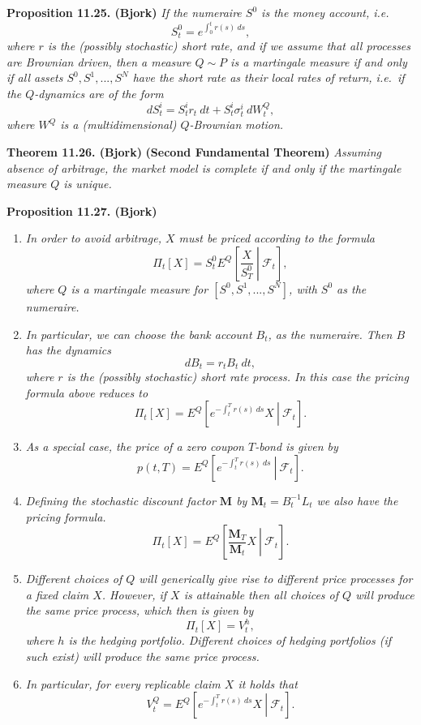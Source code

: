 \documentclass[
]{book}
\providecommand{\tightlist}{%
  \setlength{\itemsep}{0pt}\setlength{\parskip}{0pt}}
\begin{document}
\textbf{Proposition 11.25. (Bjork)} \emph{If the numeraire \(S^0\) is the money account, i.e.}
\[
S^0_t=e^{\int_0^t r(s)\ ds},
\]
\emph{where \(r\) is the (possibly stochastic) short rate, and if we assume that all processes are Brownian driven, then a measure \(Q\sim P\) is a martingale measure if and only if all assets \(S^0,S^1,...,S^N\) have the short rate as their local rates of return, i.e.~if the \(Q\)-dynamics are of the form}
\[
dS_t^i=S_t^ir_t\ dt+S_t^i \sigma_t^i\ dW_t^Q,\tag{11.54}
\]
\emph{where \(W^Q\) is a (multidimensional) \(Q\)-Brownian motion.}

\textbf{Theorem 11.26. (Bjork)} \textbf{(Second Fundamental Theorem)} \emph{Assuming absence of arbitrage, the market model is complete if and only if the martingale measure \(Q\) is unique.}

\textbf{Proposition 11.27. (Bjork)}

\begin{enumerate}
\def\labelenumi{\arabic{enumi}.}
\tightlist
\item
  \emph{In order to avoid arbitrage, \(X\) must be priced according to the formula}
  \[
    \Pi_t[X]=S^0_tE^Q\left[\left. \frac{X}{S^0_T}\ \right\vert\ \mathcal{F}_t\right],\tag{11.55}
    \]
  \emph{where \(Q\) is a martingale measure for \([S^0,S^1,...,S^N]\), with \(S^0\) as the numeraire.}
\item
  \emph{In particular, we can choose the bank account \(B_t\), as the numeraire. Then \(B\) has the dynamics}
  \[
    dB_t=r_tB_t\ dt,\tag{11.56}
    \]
  \emph{where \(r\) is the (possibly stochastic) short rate process. In this case the pricing formula above reduces to}
  \[
    \Pi_t[X]=E^Q\left[\left. e^{-\int_t^T r(s)\ ds}X\ \right\vert\ \mathcal{F}_t\right].\tag{11.57}
    \]
\item
  \emph{As a special case, the price of a zero coupon \(T\)-bond is given by}
  \[
    p(t,T)=E^Q\left[\left. e^{-\int_t^T r(s)\ ds}\ \right\vert\ \mathcal{F}_t\right].\tag{11.58}
    \]
\item
  \emph{Defining the stochastic discount factor \(\mathbf{M}\) by \(\mathbf{M}_t=B_t^{-1}L_t\) we also have the pricing formula.}
  \[
    \Pi_t[X]=E^Q\left[\left. \frac{\mathbf{M}_T}{\mathbf{M}_t}X\ \right\vert\ \mathcal{F}_t\right].\tag{11.59}
    \]
\item
  \emph{Different choices of \(Q\) will generically give rise to different price processes for a fixed claim \(X\). However, if \(X\) is attainable then all choices of \(Q\) will produce the same price process, which then is given by}
  \[
    \Pi_t[X]=V_t^h,\tag{11.60}
    \]
  \emph{where \(h\) is the hedging portfolio. Different choices of hedging portfolios (if such exist) will produce the same price process.}
\item
  \emph{In particular, for every replicable claim \(X\) it holds that}
  \[
    V_t^Q=E^Q\left[\left. e^{-\int_t^T r(s)\ ds}X\ \right\vert\ \mathcal{F}_t\right].\tag{11.61}
    \]
\end{enumerate}
\end{document}
